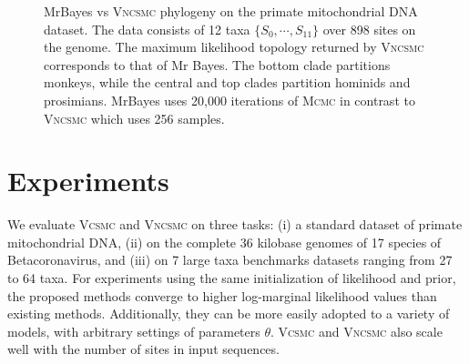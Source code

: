 \documentclass[accepted]{uai2021} %
\theoremstyle{definition}
\begin{document}
\begin{figure*}[!ht]
{}
\caption{ MrBayes vs \textsc{Vncsmc} phylogeny on the primate mitochondrial DNA dataset. The data consists of 12 taxa $\{S_0,\cdots, S_{11}\}$ over 898 sites on the genome. %
The maximum likelihood topology returned by \textsc{Vncsmc} corresponds to that of Mr Bayes. The bottom clade partitions monkeys, while the central and top clades partition
hominids and prosimians. MrBayes uses 20,000 iterations of \textsc{Mcmc} in contrast to \textsc{Vncsmc} which uses 256 samples.
    }
    \label{fig:primatestree}
\end{figure*}




\section{Experiments}
\label{results}
We evaluate \textsc{Vcsmc} and \textsc{Vncsmc} on three tasks: (i) a standard dataset of primate mitochondrial DNA, (ii) on the complete 36 kilobase genomes of 17 species of Betacoronavirus, and (iii) on 7 large taxa benchmarks datasets ranging from 27 to 64 taxa. For experiments using the same initialization of likelihood and prior, the proposed methods converge to higher log-marginal likelihood values than existing methods. Additionally, they can be more easily adopted to a variety of models, with arbitrary settings of parameters $\theta$. \textsc{Vcsmc} and \textsc{Vncsmc} also scale well with the number of sites in input sequences.
\end{document}

